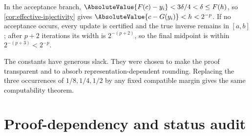 \documentclass[11pt,oneside]{article}
\theoremstyle{definition}
\theoremstyle{remark}
\numberwithin{equation}{section}
\begin{document}
In the acceptance branch,
$\AbsoluteValue{F(c)-y_i}<3\delta/4<\delta\le F(h)$, so
\cref{cor:effective-injectivity} gives
$\AbsoluteValue{c-G(y_i)}<h<2^{-p}$.  If no acceptance occurs, every update is
certified and the true inverse remains in $[a,b]$; after $p+2$ iterations its
width is $2^{-(p+2)}$, so the final midpoint is within
$2^{-(p+3)}<2^{-p}$.

The constants have generous slack.  They were chosen to make the proof
transparent and to absorb representation-dependent rounding.  Replacing the
three occurrences of $1/8,1/4,1/2$ by any fixed compatible margin gives the
same computability theorem.

\section{Proof-dependency and status audit}
\label{app:dependency-audit}
\end{document}
